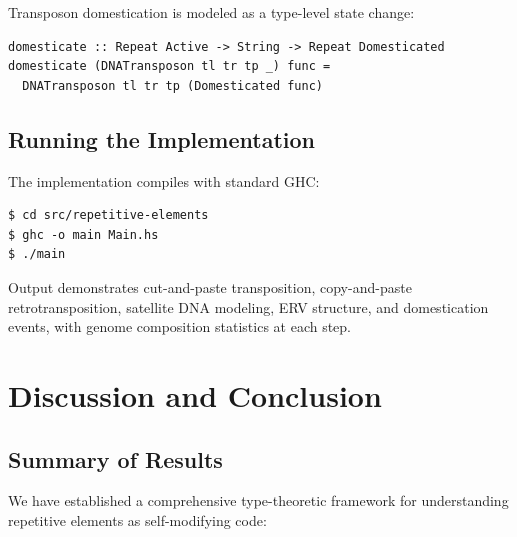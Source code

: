 \documentclass[12pt,a4paper]{article}
\begin{document}
Transposon domestication is modeled as a type-level state change:

\begin{verbatim}
domesticate :: Repeat Active -> String -> Repeat Domesticated
domesticate (DNATransposon tl tr tp _) func =
  DNATransposon tl tr tp (Domesticated func)
\end{verbatim}

\subsection{Running the Implementation}

The implementation compiles with standard GHC:

\begin{verbatim}
$ cd src/repetitive-elements
$ ghc -o main Main.hs
$ ./main
\end{verbatim}

Output demonstrates cut-and-paste transposition, copy-and-paste retrotransposition,
satellite DNA modeling, ERV structure, and domestication events, with genome composition
statistics at each step.


\section{Discussion and Conclusion}\label{sec:discussion}

\subsection{Summary of Results}

We have established a comprehensive type-theoretic framework for understanding
repetitive elements as self-modifying code:
\end{document}
